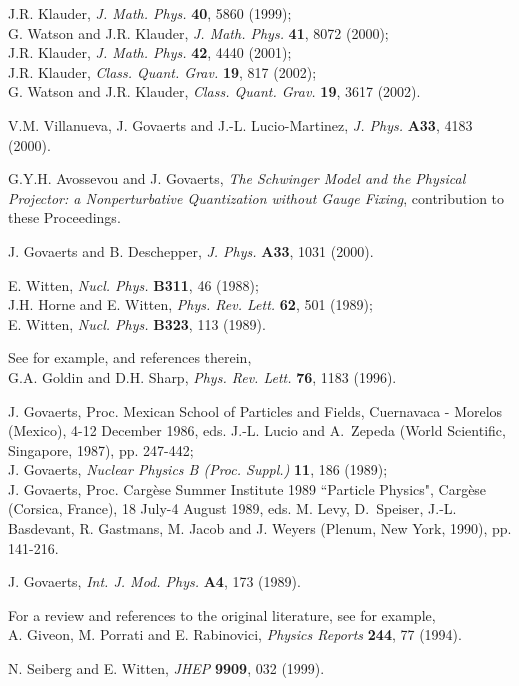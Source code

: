 \documentclass[a4paper,11pt]{article}
\begin{document}
\begin{thebibliography}{99}
J.R. Klauder, {\em J. Math. Phys.\/} {\bf 40}, 5860 (1999);\\
G. Watson and J.R. Klauder, {\em J. Math. Phys.\/} {\bf 41}, 8072 (2000);\\
J.R. Klauder, {\em J. Math. Phys.\/} {\bf 42}, 4440 (2001);\\
J.R. Klauder, {\em Class. Quant. Grav.\/} {\bf 19}, 817 (2002);\\
G. Watson and J.R. Klauder, {\em Class. Quant. Grav.\/} {\bf 19}, 3617 (2002).

V.M. Villanueva, J. Govaerts and J.-L. Lucio-Martinez, {\em J. Phys.\/}
{\bf A33}, 4183 (2000).

 G.Y.H. Avossevou and J. Govaerts, {\sl The Schwinger Model
and the Physical Projector: a Nonperturbative Quantization without Gauge
Fixing\/}, contribution to these Proceedings.

J. Govaerts and B. Deschepper, {\em J. Phys.\/} {\bf A33}, 1031 (2000).

E. Witten, {\em Nucl. Phys.\/} {\bf B311}, 46 (1988);\\
J.H. Horne and E. Witten, {\em Phys. Rev. Lett.\/} {\bf 62}, 501 (1989);\\
E. Witten, {\em Nucl. Phys.\/} {\bf B323}, 113 (1989).

 See for example, and references therein,\\
G.A. Goldin and D.H. Sharp, {\em Phys. Rev. Lett.\/} {\bf 76}, 1183 (1996).

J. Govaerts, Proc. \coordHE{} Mexican School of Particles and 
Fields, Cuernavaca - Morelos (Mexico), 4-12 December 1986,
eds. J.-L. Lucio and A.~Zepeda (World Scientific, Singapore, 1987), pp. 247-442;\\
J. Govaerts, {\sl Nuclear Physics B (Proc. Suppl.)} {\bf 11}, 186 (1989);\\
J. Govaerts, Proc. Carg\`ese Summer Institute 1989 
``Particle Physics", Carg\`ese (Corsica, France), 18 July-4 August 1989,
eds. M. Levy, D.~Speiser, J.-L. Basdevant, R. Gastmans,
M. Jacob and J. Weyers (Plenum, New York, 1990), pp. 141-216.

J. Govaerts, {\em Int. J. Mod. Phys.} {\bf A4}, 173 (1989).

 For a review and references to the original literature, see
for example,\\
A. Giveon, M. Porrati and E. Rabinovici, {\em Physics Reports\/} {\bf 244}, 
77 (1994).

N. Seiberg and E. Witten, {\em JHEP\/} {\bf 9909}, 032 (1999).

\end{thebibliography}
\end{document}
